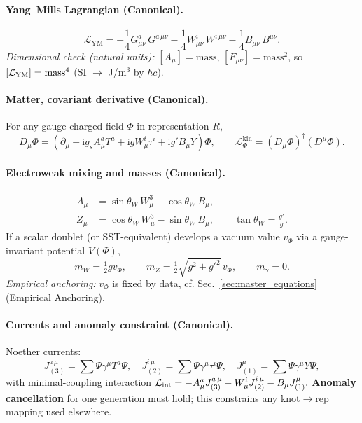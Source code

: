 \documentclass[11pt]{article}
\newcommand{\ii}{\mathrm{i}}
\newcommand{\GsA}{G^a_{\mu\nu}}
\newcommand{\WsI}{W^i_{\mu\nu}}
\newcommand{\Bmn}{B_{\mu\nu}}
\begin{document}
\paragraph{Yang--Mills Lagrangian (Canonical).}
\begin{equation}
	\mathcal{L}_{\text{YM}}
	= -\frac{1}{4} \GsA \, G^{a\,\mu\nu}
	-\frac{1}{4} \WsI \, W^{i\,\mu\nu}
	-\frac{1}{4} \Bmn \, B^{\mu\nu}.
	\label{eq:YM-core}
\end{equation}
\textit{Dimensional check (natural units):} $[A_\mu]=\text{mass}$, $[F_{\mu\nu}]=\text{mass}^2$, so $[\mathcal L_{\rm YM}]=\text{mass}^4$ (SI $\to$ J/m$^3$ by \(\hbar c\)).

\paragraph{Matter, covariant derivative (Canonical).}
For any gauge-charged field $\Phi$ in representation $R$,
\begin{equation}
	D_\mu \Phi
	= \left(\partial_\mu + \ii g_s A^a_\mu T^a
	+ \ii g W^i_\mu \tau^i
	+ \ii g' B_\mu Y \right)\Phi,
	\qquad
	\mathcal{L}_{\Phi}^{\text{kin}}=(D_\mu\Phi)^\dagger (D^\mu\Phi).
	\label{eq:covder}
\end{equation}

\paragraph{Electroweak mixing and masses (Canonical).}
\begin{align}
	A_\mu &= \sin\theta_W\, W^3_\mu + \cos\theta_W\, B_\mu,\label{eq:photon}\\
	Z_\mu &= \cos\theta_W\, W^3_\mu - \sin\theta_W\, B_\mu,\qquad \tan\theta_W=\frac{g'}{g}.
\end{align}
If a scalar doublet (or SST-equivalent) develops a vacuum value $v_\Phi$ via a gauge-invariant potential $V(\Phi)$,
\begin{equation}
	m_W = \tfrac{1}{2} g v_\Phi,\qquad
	m_Z = \tfrac{1}{2}\sqrt{g^2+g'^2}\,v_\Phi,\qquad
	m_\gamma=0. \label{eq:ew_masses}
\end{equation}
\textit{Empirical anchoring:} $v_\Phi$ is fixed by data, cf. Sec.~\ref{sec:master_equations} (Empirical Anchoring).

\paragraph{Currents and anomaly constraint (Canonical).}
Noether currents:
\[
	J^{a\,\mu}_{(3)}=\sum \bar{\Psi}\gamma^\mu T^a\Psi,\quad
	J^{i\,\mu}_{(2)}=\sum \bar{\Psi}\gamma^\mu \tau^i\Psi,\quad
	J^\mu_{(1)}=\sum \bar{\Psi}\gamma^\mu Y\Psi,
\]
with minimal-coupling interaction
\(
\mathcal L_{\rm int}=- A^a_\mu J^{a\,\mu}_{(3)} - W^i_\mu J^{i\,\mu}_{(2)} - B_\mu J^\mu_{(1)}.
\)
\textbf{Anomaly cancellation} for one generation must hold; this constrains any knot\(\to\)rep mapping used elsewhere.
\end{document}
